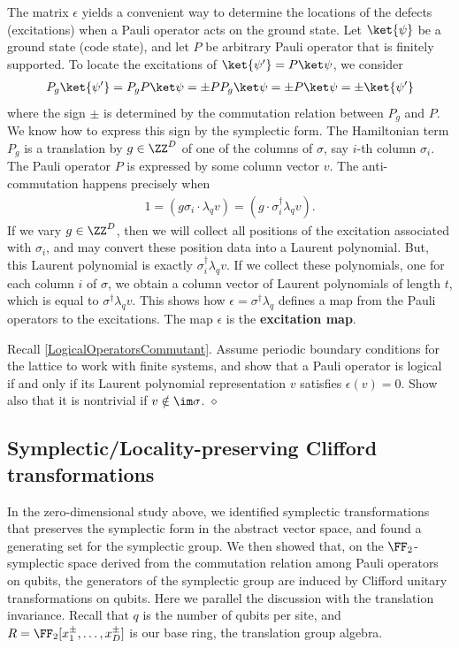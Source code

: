 The matrix $\epsilon$ yields a convenient way to determine the locations of the defects (excitations)
when a Pauli operator acts on the ground state.
Let $\ket{\psi}$ be a ground state (code state), and let $P$ be arbitrary Pauli operator that is finitely supported.
To locate the excitations of $\ket{\psi'} = P \ket \psi$, we consider
\begin{align}
P_g \ket{\psi'} = P_g P \ket \psi = \pm P P_g \ket \psi = \pm P \ket \psi = \pm \ket{\psi'}
\end{align}
where the sign $\pm$ is determined by the commutation relation between $P_g$ and $P$.
We know how to express this sign by the symplectic form.
The Hamiltonian term $P_g$ is a translation by $g \in \ZZ^D$ 
of one of the columns of $\sigma$, say $i$-th column $\sigma_i$.
The Pauli operator $P$ is expressed by some column vector $v$.
The anti-commutation happens precisely when
\begin{align}
1 = (g\sigma_i \cdot \lambda_q v)  = ( g \cdot \sigma_i^\dagger \lambda_q v).
\end{align}
If we vary $g \in \ZZ^D$, 
then we will collect all positions of the excitation associated with $\sigma_i$,
and may convert these position data into a Laurent polynomial.
But, this Laurent polynomial is exactly $\sigma_i^\dagger \lambda_q v$.
If we collect these polynomials, one for each column $i$ of $\sigma$,
we obtain a column vector of Laurent polynomials of length $t$,
which is equal to $\sigma^\dagger \lambda_q v$.
This shows how $\epsilon = \sigma^\dagger \lambda_q$
defines a map from the Pauli operators to the excitations.
The map $\epsilon$ is the {\bf excitation map}.

\begin{exc}
Recall \ref{LogicalOperatorsCommutant}.
Assume periodic boundary conditions for the lattice
to work with finite systems,
and show that a Pauli operator is logical if and only if 
its Laurent polynomial representation $v$ satisfies $\epsilon(v) = 0$.
Show also that it is nontrivial if $v \notin \im \sigma$.
\label{LogicalOperatorExcitationMap}
\hfill $\diamond$ \end{exc}

\subsection{Symplectic/Locality-preserving Clifford transformations}
\label{sec:LatticeSympTrans}

In the zero-dimensional study above,
we identified symplectic transformations that preserves the symplectic form
in the abstract vector space, and found a generating set for the symplectic group.
We then showed that, on the $\FF_2$-symplectic space 
derived from the commutation relation among Pauli operators on qubits,
the generators of the symplectic group
are induced by Clifford unitary transformations on qubits.
Here we parallel the discussion with the translation invariance.
Recall that $q$ is the number of qubits per site, 
and $R = \FF_2 [x_1^\pm, \ldots, x_D^\pm]$ is our base ring, the translation group algebra.


